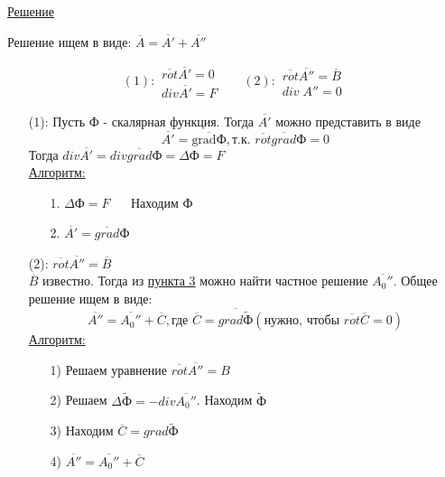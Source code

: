 \documentclass[12pt]{article}
\begin{document}
\begin{enumerate}
    \underline{Решение}
    \begin{center}
      Решение ищем в виде: $\overline{A}=\overline{A'}+\overline{A''}$
    \end{center}
    \[(1):\begin{matrix}
      \overline{rot}\overline{A'}=0\\
      div \overline{A'}=F
    \end{matrix}
    \hspace{20pt} 
    (2):\begin{matrix}
      \overline{rot} \overline{A''}=\overline{B}\\
      div \; A'' = 0
    \end{matrix}\]
    \begin{enumerate}
      \item[(1):] Пусть Ф - скалярная функция. Тогда $\overline{A'}$ можно представить в виде
      \[\overline{A'}=\overline{\text{gradФ}},\text{т.к. } \overline{rot}\overline{grad}\text{Ф}=0\]
      Тогда $div \overline{A'}=div\overline{grad}\text{Ф}=\Delta \text{Ф}=F$\\
      \underline{Алгоритм:}
      \begin{enumerate}
        \item[1.] $\Delta \text{Ф}=F \hspace{20pt} \text{Находим Ф}$
        \item[2.] $\overline{A'}=\overline{grad}\text{Ф}$ 
      \end{enumerate}
      \item[(2):] $\overline{rot}\overline{A''}=\overline{B}$\\
      $\overline{B}$ известно. Тогда из \hyperref[punkt3]{пункта 3} можно найти частное решение
      $\overline{A_0''}$. Общее решение ищем в виде:
      \[\overline{A''}=\overline{A_0''}+\overline{C},\text{где } 
      \overline{C}=\overline{grad\tilde{\text{Ф}}}(\text{нужно, чтобы }
      \overline{rot}\overline{C}=0)\]
      \underline{Алгоритм:}
      \begin{enumerate}
        \item[1)] Решаем уравнение $\overline{rot}\overline{A''}=B$
        \item[2)] Решаем $\Delta \tilde{\text{Ф}}=-div\overline{A_0''}$. Находим $\tilde{\text{Ф}}$
        \item[3)] Находим $\overline{C}=grad \tilde{\text{Ф}}$
        \item[4)] $\overline{A''}=\overline{A_0''}+\overline{C}$
      \end{enumerate}
    \end{enumerate}
  \end{enumerate}
\end{document}
